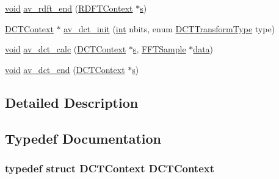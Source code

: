\begin{DoxyCompactItemize}
\hyperlink{sound_8c_ae35f5844602719cf66324f4de2a658b3}{void} \hyperlink{group__lavc__fft_ga9d0be7a2253417ab4bb53a08bb70dfce}{av\+\_\+rdft\+\_\+end} (\hyperlink{group__lavc__fft_gad6a19df0e8cfc4d67a325e4f91fd9cd9}{R\+D\+F\+T\+Context} $\ast$\hyperlink{lib_2expat_8h_a755339d27872b13735c2cab829e47157}{s})
\item 
\hyperlink{group__lavc__fft_ga904cbe02e46b560fd98d172fdb27c845}{D\+C\+T\+Context} $\ast$ \hyperlink{group__lavc__fft_ga64a4f6938a7f836305672ef6a7d23d6c}{av\+\_\+dct\+\_\+init} (\hyperlink{xmltok_8h_a5a0d4a5641ce434f1d23533f2b2e6653}{int} nbits, enum \hyperlink{group__lavc__fft_gaeeabd062332b246d19bed36e041d2df6}{D\+C\+T\+Transform\+Type} type)
\item 
\hyperlink{sound_8c_ae35f5844602719cf66324f4de2a658b3}{void} \hyperlink{group__lavc__fft_ga11f6dd46c458176ef8440c7a15bea7d0}{av\+\_\+dct\+\_\+calc} (\hyperlink{group__lavc__fft_ga904cbe02e46b560fd98d172fdb27c845}{D\+C\+T\+Context} $\ast$\hyperlink{lib_2expat_8h_a755339d27872b13735c2cab829e47157}{s}, \hyperlink{group__lavc__fft_gaa306dc16df543b25d9910debc3f76b96}{F\+F\+T\+Sample} $\ast$\hyperlink{lib_2expat_8h_ac39e72a1de1cb50dbdc54b08d0432a24}{data})
\item 
\hyperlink{sound_8c_ae35f5844602719cf66324f4de2a658b3}{void} \hyperlink{group__lavc__fft_gaf529d0ebe6f05c419d4b995322993517}{av\+\_\+dct\+\_\+end} (\hyperlink{group__lavc__fft_ga904cbe02e46b560fd98d172fdb27c845}{D\+C\+T\+Context} $\ast$\hyperlink{lib_2expat_8h_a755339d27872b13735c2cab829e47157}{s})
\end{DoxyCompactItemize}


\subsection{Detailed Description}


\subsection{Typedef Documentation}
\subsubsection[{\texorpdfstring{D\+C\+T\+Context}{DCTContext}}]{\setlength{\rightskip}{0pt plus 5cm}typedef struct {\bf D\+C\+T\+Context} {\bf D\+C\+T\+Context}}\hypertarget{group__lavc__fft_ga904cbe02e46b560fd98d172fdb27c845}{}\label{group__lavc__fft_ga904cbe02e46b560fd98d172fdb27c845}


